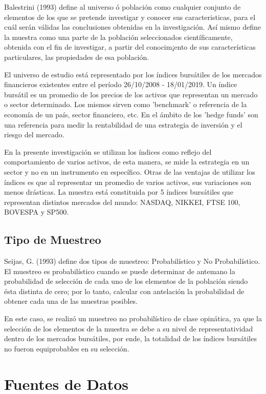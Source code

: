 \documentclass[a4paper,12pt]{Latex/Classes/PhDthesisPSnPDF}
\begin{document}
Balestrini (1993) define al universo ó población como cualquier conjunto de elementos de los que se pretende investigar y conocer sus caracteristicas, para el cuál serán válidas las conclusiones obtenidas en la investigación. Así mismo define la muestra como una parte de la población seleccionados científicamente, obtenida con el fin de investigar, a partir del conocim¡ento de sus características particulares, las propiedades de esa población.

El universo de estudio está representado por los índices bursátiles de los mercados financieros existentes entre el período 26/10/2008 - 18/01/2019. Un índice bursátil es un promedio de los precios de los activos que representan un mercado o sector determinado. Los mismos sirven como 'benchmark' o referencia de la economía de un país, sector financiero, etc. En el ámbito de los 'hedge funds' son una referencia para medir la rentabilidad de una estrategia de inversión y el riesgo del mercado.

En la presente investigación se utilizan los índices como reflejo del comportamiento de varios activos, de esta manera, se mide la estrategia en un sector y no en un instrumento en específico. Otras de las ventajas de utilizar los índices es que al representar un promedio de varios activos, sus variaciones son menos drásticas. La muestra está constituida por 5 índices bursátiles que representan distintos mercados del mundo: NASDAQ, NIKKEI, FTSE 100, BOVESPA y SP500.


\subsection{Tipo de Muestreo}

Seijas, G. (1993) define dos tipos de muestreo: Probabilístico y No Probabilístico.  El muestreo es probabilístico cuando se puede determinar de antemano la probabilidad de selección de cada uno de los elementos de la población siendo ésta distinta de cero; por lo tanto, calcular con antelación la probabilidad de obtener cada una de las muestras posibles.

En este caso, se realizó un muestreo no probabilístico de clase opinática, ya que la selección de los elementos de la muestra se debe a su nivel de representatividad dentro de los mercados bursátiles, por ende, la totalidad de los índices bursátiles no fueron equiprobables en su selección.

\section{Fuentes de Datos}
\end{document}
